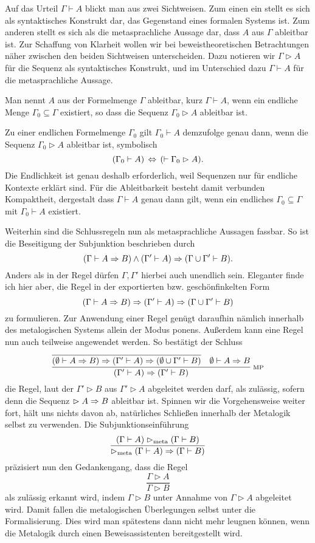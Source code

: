 Auf das Urteil $\Gamma\vdash A$ blickt man aus zwei Sichtweisen. Zum
einen ein stellt es sich als syntaktisches Konstrukt dar, das Gegenstand
eines formalen Systems ist. Zum anderen stellt es sich als die
metasprachliche Aussage dar, dass $A$ aus $\Gamma$ ableitbar ist. Zur
Schaffung von Klarheit wollen wir bei beweistheoretischen Betrachtungen
näher zwischen den beiden Sichtweisen unterscheiden. Dazu notieren
wir $\Gamma\vartriangleright A$ für die Sequenz als syntaktisches Konstrukt,
und im Unterschied dazu $\Gamma\vdash A$ für die metasprachliche Aussage.
\begin{Definition}[Ableitbarkeit]\newlinefirst
Man nennt $A$ aus der Formelmenge $\Gamma$ ableitbar, kurz
$\Gamma\vdash A$, wenn ein endliche Menge $\Gamma_0\subseteq\Gamma$
existiert, so dass die Sequenz $\Gamma_0\vartriangleright A$ ableitbar ist.
\end{Definition}
Zu einer endlichen Formelmenge $\Gamma_0$ gilt $\Gamma_0\vdash A$
demzufolge genau dann, wenn die Sequenz $\Gamma_0\vartriangleright A$
ableitbar ist, symbolisch%
\[(\Gamma_0\vdash A)\,\Leftrightarrow\, (\vdash \Gamma_0\vartriangleright A).\]
Die Endlichkeit ist genau deshalb erforderlich, weil Sequenzen nur für
endliche Kontexte erklärt sind. Für die Ableitbarkeit besteht damit
verbunden Kompaktheit, dergestalt dass $\Gamma\vdash A$ genau dann gilt,
wenn ein endliches $\Gamma_0\subseteq\Gamma$ mit $\Gamma_0\vdash A$
existiert.

Weiterhin sind die Schlussregeln nun als metasprachliche Aussagen
fassbar. So ist die Beseitigung der Subjunktion beschrieben durch%
\[(\Gamma\vdash A\Rightarrow B)\land (\Gamma'\vdash A)\Rightarrow (\Gamma\cup\Gamma'\vdash B).\]
Anders als in der Regel dürfen $\Gamma,\Gamma'$ hierbei auch
unendlich sein. Eleganter finde ich hier aber, die Regel in der
exportierten bzw. geschönfinkelten Form
\[(\Gamma\vdash A\Rightarrow B)\Rightarrow (\Gamma'\vdash A)\Rightarrow (\Gamma\cup\Gamma'\vdash B)\]
zu formulieren. Zur Anwendung einer Regel genügt daraufhin nämlich
innerhalb des metalogischen Systems allein der Modus ponens. Außerdem
kann eine Regel nun auch teilweise angewendet werden. So bestätigt
der Schluss
\[\infer[\infernote{MP}]{(\Gamma'\vdash A)\cond (\Gamma'\vdash B)}{
  \infer{(\emptyset\vdash A\cond B)\cond (\Gamma'\vdash A)\cond (\emptyset\cup\Gamma'\vdash B)}{}
& \emptyset\vdash A\cond B}\]
die Regel, laut der $\Gamma'\vartriangleright B$
aus $\Gamma'\vartriangleright A$ abgeleitet werden darf, als zulässig,
sofern denn die Sequenz $\vartriangleright A\Rightarrow B$ ableitbar ist.
Spinnen wir die Vorgehensweise weiter fort, hält uns nichts davon ab,
natürliches Schließen innerhalb der Metalogik selbst zu verwenden.
Die Subjunktionseinführung
\[\dfrac{(\Gamma\vdash A)\vartriangleright_\text{meta} (\Gamma\vdash B)}{
\vartriangleright_\text{meta} (\Gamma\vdash A)\Rightarrow (\Gamma\vdash B)}\]
präzisiert nun den Gedankengang, dass die Regel
\[\dfrac{\Gamma\vartriangleright A}{\Gamma\vartriangleright B}\]
als zulässig erkannt wird, indem $\Gamma\vartriangleright B$ unter
Annahme von $\Gamma\vartriangleright A$ abgeleitet wird. Damit fallen
die metalogischen Überlegungen selbst unter die Formalisierung. Dies
wird man spätestens dann nicht mehr leugnen können, wenn die
Metalogik durch einen Beweisassistenten bereitgestellt wird.

